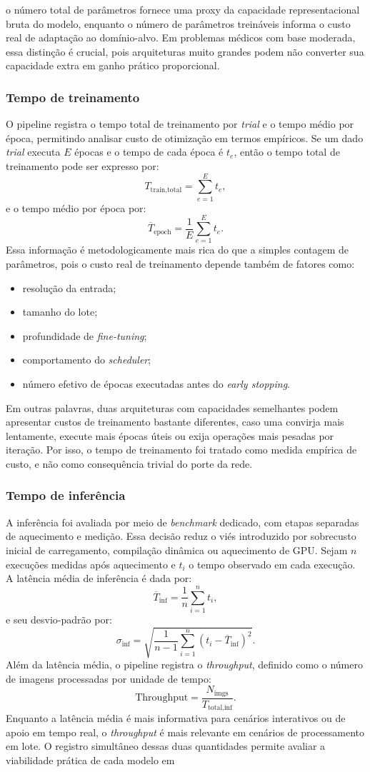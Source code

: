 \documentclass[tcc,capa]{texufpel}
\begin{document}
o número total de parâmetros fornece uma proxy da capacidade representacional bruta do modelo, enquanto o número de parâmetros treináveis informa o custo real de adaptação ao domínio-alvo. Em problemas médicos com base moderada, essa distinção é crucial, pois arquiteturas muito grandes podem não converter sua capacidade extra em ganho prático proporcional. \subsubsection{Tempo de treinamento} O pipeline registra o tempo total de treinamento por \textit{trial} e o tempo médio por época, permitindo analisar custo de otimização em termos empíricos. Se um dado \textit{trial} executa \(E\) épocas e o tempo de cada época é \(t_e\), então o tempo total de treinamento pode ser expresso por: \[ T_{\text{train,total}} = \sum_{e=1}^{E} t_e, \] e o tempo médio por época por: \[ \overline{T}_{\text{epoch}} = \frac{1}{E} \sum_{e=1}^{E} t_e. \] Essa informação é metodologicamente mais rica do que a simples contagem de parâmetros, pois o custo real de treinamento depende também de fatores como: \begin{itemize} \item resolução da entrada; \item tamanho do lote; \item profundidade de \textit{fine-tuning}; \item comportamento do \textit{scheduler}; \item número efetivo de épocas executadas antes do \textit{early stopping}. \end{itemize} Em outras palavras, duas arquiteturas com capacidades semelhantes podem apresentar custos de treinamento bastante diferentes, caso uma convirja mais lentamente, execute mais épocas úteis ou exija operações mais pesadas por iteração. Por isso, o tempo de treinamento foi tratado como medida empírica de custo, e não como consequência trivial do porte da rede. \subsubsection{Tempo de inferência} A inferência foi avaliada por meio de \textit{benchmark} dedicado, com etapas separadas de aquecimento e medição. Essa decisão reduz o viés introduzido por sobrecusto inicial de carregamento, compilação dinâmica ou aquecimento de GPU. Sejam \(n\) execuções medidas após aquecimento e \(t_i\) o tempo observado em cada execução. A latência média de inferência é dada por: \[ \overline{T}_{\text{inf}} = \frac{1}{n}\sum_{i=1}^{n} t_i, \] e seu desvio-padrão por: \[ \sigma_{\text{inf}} = \sqrt{ \frac{1}{n-1} \sum_{i=1}^{n} \left(t_i - \overline{T}_{\text{inf}}\right)^2 }. \] Além da latência média, o pipeline registra o \textit{throughput}, definido como o número de imagens processadas por unidade de tempo: \[ \text{Throughput} = \frac{N_{\text{imgs}}}{T_{\text{total,inf}}}. \] Enquanto a latência média é mais informativa para cenários interativos ou de apoio em tempo real, o \textit{throughput} é mais relevante em cenários de processamento em lote. O registro simultâneo dessas duas quantidades permite avaliar a viabilidade prática de cada modelo em 
\end{document}
